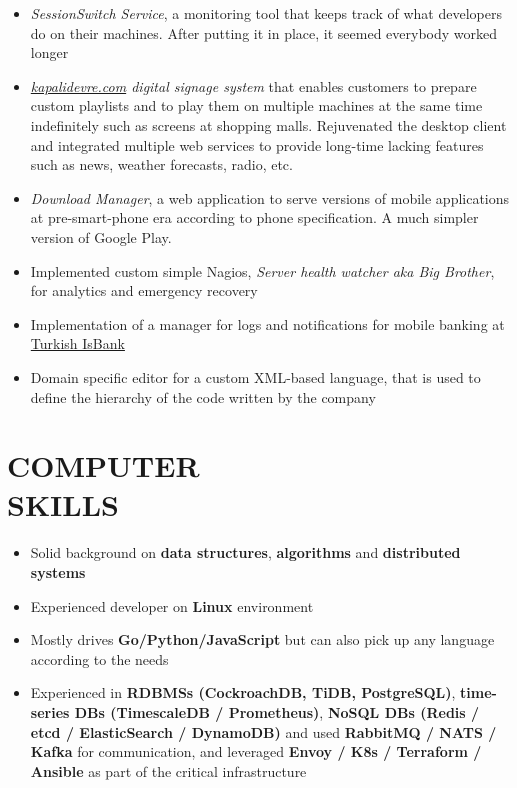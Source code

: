 \documentclass[line, margin]{res}
\begin{document}
\begin{resume}
\vspace{-0.3cm}
\begin{itemize} \itemsep -3pt
	\vspace{-.2cm}
	\item \textit{SessionSwitch Service}, a monitoring tool that keeps track of what developers do on their machines. After putting it in place, it seemed everybody worked longer
	\item \textit{\href{http://kapalidevre.com}{kapalidevre.com} digital signage system} that enables customers to prepare custom playlists and to play them on multiple machines at the same time indefinitely such as screens at shopping malls. Rejuvenated the desktop client and integrated multiple web services to provide long-time lacking features such as news, weather forecasts, radio, etc.
	\item \textit{Download Manager}, a web application to serve versions of mobile applications at pre-smart-phone era according to phone specification. A much simpler version of Google Play.
	\item Implemented custom simple Nagios, \textit{Server health watcher aka Big Brother}, for analytics and emergency recovery
	\item Implementation of a manager for logs and notifications for mobile banking at \href{http://www.isbank.com.tr/English/}{Turkish IsBank}
	\item Domain specific editor for a custom XML-based language, that is used to define the hierarchy of the code written by the company
\end{itemize}

\section{COMPUTER \\ SKILLS}
\begin{itemize} \itemsep -3pt
	\item Solid background on \textbf{data structures}, \textbf{algorithms} and \textbf{distributed systems}
	\item Experienced developer on \textbf{Linux} environment
	\item Mostly drives \textbf{Go/Python/JavaScript} but can also pick up any language according to the needs
	\item Experienced in \textbf{RDBMSs (CockroachDB, TiDB, PostgreSQL)}, \textbf{time-series DBs (TimescaleDB / Prometheus)}, \textbf{NoSQL DBs (Redis / etcd / ElasticSearch / DynamoDB)} and used \textbf{RabbitMQ / NATS / Kafka} for communication, and leveraged \textbf{Envoy / K8s / Terraform / Ansible} as part of the critical infrastructure
\end{itemize}


\end{resume}
\end{document}
